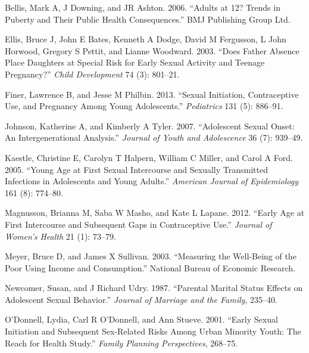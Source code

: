 \documentclass[
]{article}
\newlength{\cslhangindent}
\newenvironment{cslreferences}%
  {\setlength{\parindent}{0pt}%
  \everypar{\setlength{\hangindent}{\cslhangindent}}\ignorespaces}%
  {\par}
\begin{document}
\hypertarget{refs}{}
\begin{cslreferences}
\leavevmode\hypertarget{ref-bellis2006adults}{}%
Bellis, Mark A, J Downing, and JR Ashton. 2006. ``Adults at 12? Trends
in Puberty and Their Public Health Consequences.'' BMJ Publishing Group
Ltd.

\leavevmode\hypertarget{ref-ellis2003does}{}%
Ellis, Bruce J, John E Bates, Kenneth A Dodge, David M Fergusson, L John
Horwood, Gregory S Pettit, and Lianne Woodward. 2003. ``Does Father
Absence Place Daughters at Special Risk for Early Sexual Activity and
Teenage Pregnancy?'' \emph{Child Development} 74 (3): 801--21.

\leavevmode\hypertarget{ref-finer2013sexual}{}%
Finer, Lawrence B, and Jesse M Philbin. 2013. ``Sexual Initiation,
Contraceptive Use, and Pregnancy Among Young Adolescents.''
\emph{Pediatrics} 131 (5): 886--91.

\leavevmode\hypertarget{ref-johnson2007adolescent}{}%
Johnson, Katherine A, and Kimberly A Tyler. 2007. ``Adolescent Sexual
Onset: An Intergenerational Analysis.'' \emph{Journal of Youth and
Adolescence} 36 (7): 939--49.

\leavevmode\hypertarget{ref-kaestle2005young}{}%
Kaestle, Christine E, Carolyn T Halpern, William C Miller, and Carol A
Ford. 2005. ``Young Age at First Sexual Intercourse and Sexually
Transmitted Infections in Adolescents and Young Adults.'' \emph{American
Journal of Epidemiology} 161 (8): 774--80.

\leavevmode\hypertarget{ref-magnusson2012early}{}%
Magnusson, Brianna M, Saba W Masho, and Kate L Lapane. 2012. ``Early Age
at First Intercourse and Subsequent Gaps in Contraceptive Use.''
\emph{Journal of Women's Health} 21 (1): 73--79.

\leavevmode\hypertarget{ref-meyer2003measuring}{}%
Meyer, Bruce D, and James X Sullivan. 2003. ``Measuring the Well-Being
of the Poor Using Income and Consumption.'' National Bureau of Economic
Research.

\leavevmode\hypertarget{ref-newcomer1987parental}{}%
Newcomer, Susan, and J Richard Udry. 1987. ``Parental Marital Status
Effects on Adolescent Sexual Behavior.'' \emph{Journal of Marriage and
the Family}, 235--40.

\leavevmode\hypertarget{ref-o2001early}{}%
O'Donnell, Lydia, Carl R O'Donnell, and Ann Stueve. 2001. ``Early Sexual
Initiation and Subsequent Sex-Related Risks Among Urban Minority Youth:
The Reach for Health Study.'' \emph{Family Planning Perspectives},
268--75.


\end{cslreferences}
\end{document}
